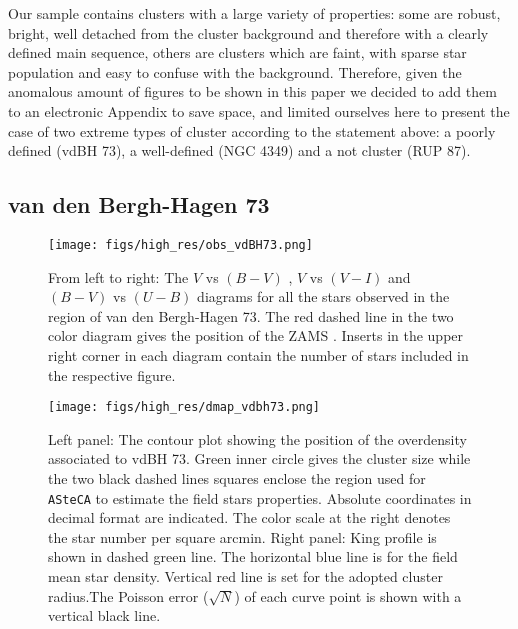 \documentclass{aa}
\begin{document}
Our sample contains clusters with a large variety of properties: some are
robust, bright, well detached from the cluster background and therefore with a
clearly defined main sequence, others are clusters which are faint, with sparse
star population and easy to confuse with the background. Therefore, given the
anomalous amount of figures to be shown in this paper we decided to add them to
an electronic Appendix to save space, and limited ourselves here to present the
case of two extreme types of cluster according to the statement above: a poorly
defined (vdBH 73), a well-defined (NGC 4349) and a not cluster 
(RUP 87).


\subsection{van den Bergh-Hagen 73}

\begin{figure*}[ht]
    \centering
    \texttt{[image: figs/high\_res/obs\_vdBH73.png]}
    \caption{From left to right: The $V$ vs $(B-V)$ , $V$ vs $(V-I)$ and
    $(B-V)$ vs $(U-B)$ diagrams for all the stars observed in the region of van
    den Bergh-Hagen 73.
    The red dashed line in the two color diagram gives the position of the ZAMS
    \citep{Aller1982}. Inserts in the upper right corner in each
    diagram contain the number of stars included in the respective figure.}
    \label{fig3}
\end{figure*}

\begin{figure*}[ht]
    \centering
    \texttt{[image: figs/high\_res/dmap\_vdbh73.png]}
    \caption{Left panel: The contour plot showing the position of the
    overdensity associated to vdBH 73. Green inner circle gives
    the cluster size while the two black dashed lines squares enclose the region
    used for \texttt{ASteCA} to estimate the field stars properties. Absolute
    coordinates in decimal format are indicated. The color scale at the right
    denotes the star number per square arcmin. Right panel: King profile is
    shown in dashed green line. The horizontal blue line is for the field
    mean star density. Vertical red line is set for the adopted cluster
    radius.The Poisson error ($\sqrt{N}$) of each curve point is shown with a
    vertical black line.}
    \label{fig4}
\end{figure*}
\end{document}
